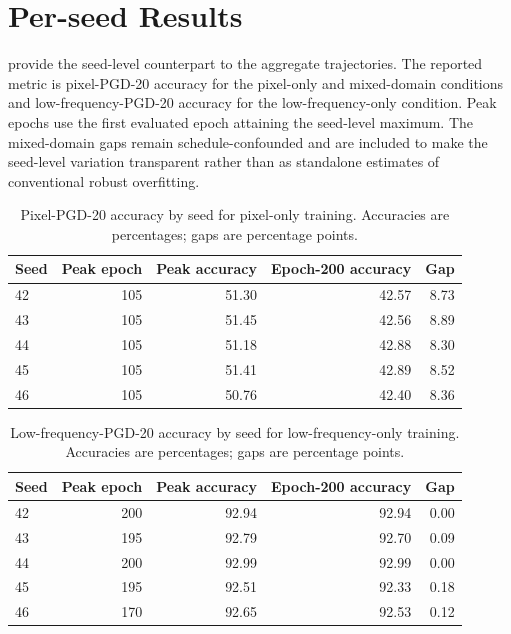 \documentclass[11pt]{article}
\begin{document}
\FloatBarrier
\appendix
\setcounter{topnumber}{5}
\setcounter{bottomnumber}{5}
\setcounter{totalnumber}{5}
\renewcommand{\topfraction}{0.9}
\renewcommand{\bottomfraction}{0.8}
\renewcommand{\textfraction}{0.1}
\renewcommand{\floatpagefraction}{0.7}
\section{Per-seed Results}
\label{app:per-seed}
provide the seed-level counterpart to the aggregate trajectories. The reported
metric is pixel-PGD-20 accuracy for the pixel-only and mixed-domain conditions
and low-frequency-PGD-20 accuracy for the low-frequency-only condition. Peak
epochs use the first evaluated epoch attaining the seed-level maximum. The
mixed-domain gaps remain schedule-confounded and are included to make the
seed-level variation transparent rather than as standalone estimates of
conventional robust overfitting.

\begin{table}[!htbp]
\centering
\caption{Pixel-PGD-20 accuracy by seed for pixel-only training.
Accuracies are percentages; gaps are percentage points.}
\label{tab:per-seed-pixel}
\begin{tabular*}{\linewidth}{@{\extracolsep{\fill}}lrrrr@{}}
\toprule
Seed & Peak epoch & Peak accuracy & Epoch-200 accuracy & Gap \\
\midrule
42 & 105 & 51.30 & 42.57 & 8.73 \\
43 & 105 & 51.45 & 42.56 & 8.89 \\
44 & 105 & 51.18 & 42.88 & 8.30 \\
45 & 105 & 51.41 & 42.89 & 8.52 \\
46 & 105 & 50.76 & 42.40 & 8.36 \\
\bottomrule
\end{tabular*}
\end{table}

\begin{table}[!htbp]
\centering
\caption{Low-frequency-PGD-20 accuracy by seed for low-frequency-only
training. Accuracies are percentages; gaps are percentage points.}
\label{tab:per-seed-low-frequency}
\begin{tabular*}{\linewidth}{@{\extracolsep{\fill}}lrrrr@{}}
\toprule
Seed & Peak epoch & Peak accuracy & Epoch-200 accuracy & Gap \\
\midrule
42 & 200 & 92.94 & 92.94 & 0.00 \\
43 & 195 & 92.79 & 92.70 & 0.09 \\
44 & 200 & 92.99 & 92.99 & 0.00 \\
45 & 195 & 92.51 & 92.33 & 0.18 \\
46 & 170 & 92.65 & 92.53 & 0.12 \\
\bottomrule
\end{tabular*}
\end{table}
\end{document}
